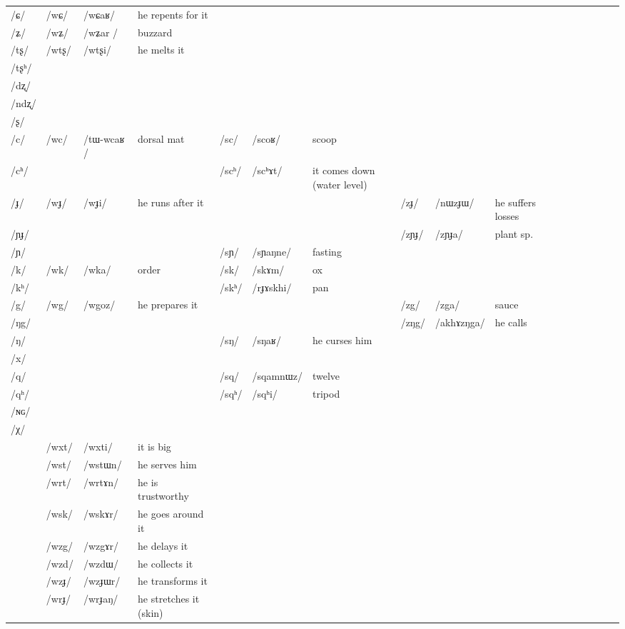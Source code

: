 \documentclass[oldfontcommands,oneside,a4paper,11pt]{article}
\newcommand{\ipa}[1]{/#1/} %
\newcommand{\tib}[1]{\cellcolor{lightgray}\textbf{#1}}
\begin{document}
\begin{table}
{\begin{tabular}{l|lll|lll|lll|lllllll}
\ipa{ɕ}  &	\ipa{wɕ}  &	\ipa{wɕaʁ}  &he repents for it&	  &	  &	&	  &	  &	&	\\
\ipa{ʑ}  &	\ipa{wʑ}  &	\ipa{wʑar }  &	buzzard&	  &	  &	&	  &	  &	&	\\
\ipa{tʂ}  &	\ipa{wtʂ}  &	\ipa{wtʂi}  & he melts it	&	  &	  &	&	  &	  &	&	\\
\ipa{tʂʰ}  &	  &	  &	&	  &	  &	&	  &	  &	&	\\
\ipa{dʐ}  &	  &	  &	&	  &	  &	&	  &	  &	&	\\
\ipa{ndʐ}  &	  &	  &	&	  &	  &	&	  &	  &	&	\\
\ipa{ʂ}  &	  &	  &	&	  &	  &	&	  &	  &	&	\\
\ipa{c}  &	\ipa{wc}  &	\ipa{tɯ-wcaʁ }  &dorsal mat	&	\ipa{sc}  &	\ipa{scoʁ}  &scoop	&	  &	  &	&	\\
\ipa{cʰ}  &	  &	  &	&	\ipa{scʰ}  &	\ipa{scʰɤt}  &	it comes down (water level)&	  &	  &	&	\\
\ipa{ɟ}  &	\ipa{wɟ}  &	\ipa{wɟi}  &he runs after it	&	  &	  &	&	\ipa{zɟ}  &	\ipa{nɯzɟɯ}  &	he suffers losses&	\\
\ipa{ɲɟ}  &	  &	  &	&	  &	  &	&	\ipa{zɲɟ}  &	\ipa{zɲɟa}  &	plant sp.&	\\
\ipa{ɲ}  &	  &	  &	&	\ipa{sɲ}  &	\ipa{sɲaŋne}  &fasting	&	   &	 &	&	\\
\ipa{k}  &	\ipa{wk}  &	\ipa{wka}  &	order&	\ipa{sk}  &	\ipa{skɤm}  &	ox&	  &	  &	&	\\
\ipa{kʰ}  &	  &	  &	&	\ipa{skʰ}  &	\ipa{rɟɤskhi}  &pan	&	  &	  &	&	\\
\ipa{g}  &	\ipa{wg}  \tib{}&	\ipa{wgoz}  &	he prepares it&	  &	  &	& 	\ipa{zg}  &	\ipa{zga}  &	sauce&	\\
\ipa{ŋg}  &	  &	  &	&	  &	  &	&	\ipa{zŋg}  &	\ipa{akhɤzŋga}  &	he calls&	\\
\ipa{ŋ}  &	  &	  &	&	\ipa{sŋ}  &	\ipa{sŋaʁ}  &	he curses him&	  &	  &	&	\\
\ipa{x}  &	  &	  &	&	  &	  &	&	  &	  &	&	\\
\ipa{q}  &	  &	  &	&	\ipa{sq}  &	\ipa{sqamnɯz}  &	twelve&	  &	  &	&	\\
\ipa{qʰ}  &	  &	  &	&	\ipa{sqʰ}  &	\ipa{sqʰi}  &	tripod&	  &	  &	&	\\
\ipa{ɴɢ}  &	  &	  &	&	  &	  &	&	  &	  &	&	\\
\ipa{χ}  &	  &	  &	&	  &	  &	&	  &	  &	&	\\
\midrule
&	\ipa{wxt}  &	\ipa{wxti}  &it is big	\\
&	\ipa{wst} \tib{} &	\ipa{wstɯn}  &he serves him	\\
&	\ipa{wrt}  \tib{} &	\ipa{wrtɤn}  &	he is trustworthy\\
&	\ipa{wsk}  \tib{} &	\ipa{wskɤr}  & he goes around it	\\
&	\ipa{wzg}  \tib{} &	\ipa{wzgɤr}  & he delays it	\\
&	\ipa{wzd}  \tib{} &	\ipa{wzdɯ}  & he collects it	\\
&	\ipa{wzɟ}  \tib{} &	\ipa{wzɟɯr}  & he transforms it	\\
&	\ipa{wrɟ}  \tib{} &	\ipa{wrɟaŋ}  &he stretches it (skin)	\\
\bottomrule
\end{tabular}} 
\end{table}
 
\end{document}

